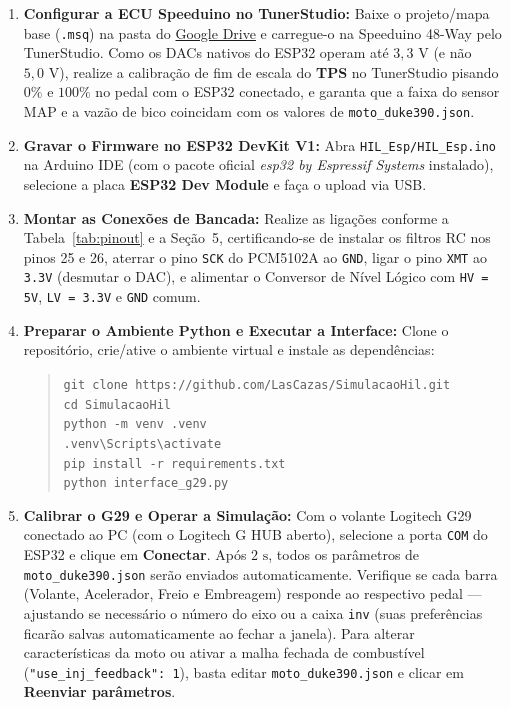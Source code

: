 \documentclass[12pt,a4paper]{article}
\begin{document}
\begin{enumerate}[itemsep=4pt]
    \item \textbf{Configurar a ECU Speeduino no TunerStudio:}
    Baixe o projeto/mapa base (\texttt{.msq}) na pasta do \href{https://drive.google.com/drive/folders/1bbK6THQXaumvtmB5yQu2AqLAyRcFz2Z0}{Google Drive} e carregue-o na Speeduino 48-Way pelo TunerStudio. Como os DACs nativos do ESP32 operam até $3{,}3\text{ V}$ (e não $5{,}0\text{ V}$), realize a calibração de fim de escala do \textbf{TPS} no TunerStudio pisando $0\%$ e $100\%$ no pedal com o ESP32 conectado, e garanta que a faixa do sensor MAP e a vazão de bico coincidam com os valores de \texttt{moto\_duke390.json}.
    \item \textbf{Gravar o Firmware no ESP32 DevKit V1:}
    Abra \texttt{HIL\_Esp/HIL\_Esp.ino} na Arduino IDE (com o pacote oficial \textit{esp32 by Espressif Systems} instalado), selecione a placa \textbf{ESP32 Dev Module} e faça o upload via USB.
    \item \textbf{Montar as Conexões de Bancada:}
    Realize as ligações conforme a Tabela~\ref{tab:pinout} e a Seção~5, certificando-se de instalar os filtros RC nos pinos 25 e 26, aterrar o pino \texttt{SCK} do PCM5102A ao \texttt{GND}, ligar o pino \texttt{XMT} ao \texttt{3.3V} (desmutar o DAC), e alimentar o Conversor de Nível Lógico com \texttt{HV = 5V}, \texttt{LV = 3.3V} e \texttt{GND} comum.
    \item \textbf{Preparar o Ambiente Python e Executar a Interface:}
    Clone o repositório, crie/ative o ambiente virtual e instale as dependências:
    \begin{quote}
    \small\texttt{git clone https://github.com/LasCazas/SimulacaoHil.git}\\
    \texttt{cd SimulacaoHil}\\
    \texttt{python -m venv .venv}\\
    \texttt{.venv\textbackslash Scripts\textbackslash activate}\\
    \texttt{pip install -r requirements.txt}\\
    \texttt{python interface\_g29.py}
    \end{quote}
    \item \textbf{Calibrar o G29 e Operar a Simulação:}
    Com o volante Logitech G29 conectado ao PC (com o Logitech G HUB aberto), selecione a porta \texttt{COM} do ESP32 e clique em \textbf{Conectar}. Após $2\text{ s}$, todos os parâmetros de \texttt{moto\_duke390.json} serão enviados automaticamente. Verifique se cada barra (Volante, Acelerador, Freio e Embreagem) responde ao respectivo pedal — ajustando se necessário o número do eixo ou a caixa \texttt{inv} (suas preferências ficarão salvas automaticamente ao fechar a janela). Para alterar características da moto ou ativar a malha fechada de combustível (\texttt{"use\_inj\_feedback": 1}), basta editar \texttt{moto\_duke390.json} e clicar em \textbf{Reenviar parâmetros}.
\end{enumerate}
\end{document}
